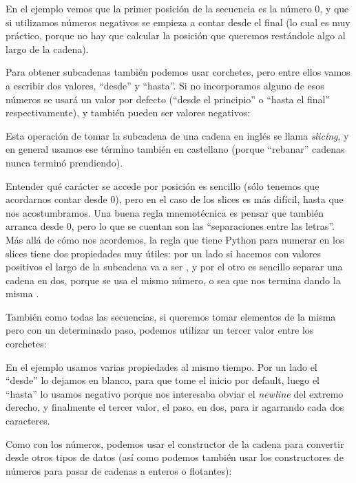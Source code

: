 En el ejemplo vemos que la primer posición de la secuencia es la número 0, y que si utilizamos números negativos se empieza a contar desde el final (lo cual es muy práctico, porque no hay que calcular la posición que queremos restándole algo al largo de la cadena).

Para obtener subcadenas también podemos usar corchetes, pero entre ellos vamos a escribir dos valores, ``desde'' y ``hasta''. Si no incorporamos alguno de esos números se usará un valor por defecto (``desde el principio'' o ``hasta el final'' respectivamente), y también pueden ser valores negativos:


Esta operación de tomar la subcadena de una cadena en inglés se llama \textit{slicing}, y en general usamos ese término también en castellano (porque ``rebanar'' cadenas nunca terminó prendiendo). 

Entender qué carácter se accede por posición es sencillo (sólo tenemos que acordarnos contar desde 0), pero en el caso de los slices es más difícil, hasta que nos acostumbramos. Una buena regla mnemotécnica es pensar que también arranca desde 0, pero lo que se cuentan son las ``separaciones entre las letras''. Más allá de cómo nos acordemos, la regla que tiene Python para numerar en los slices tiene dos propiedades muy útiles: por un lado si hacemos  con valores positivos el largo de la subcadena va a ser , y por el otro es sencillo separar una cadena en dos, porque se usa el mismo número, o sea que  nos termina dando la misma .

También como todas las secuencias, si queremos tomar elementos de la misma pero con un determinado paso, podemos utilizar un tercer valor entre los corchetes:


En el ejemplo usamos varias propiedades al mismo tiempo. Por un lado el ``desde'' lo dejamos en blanco, para que tome el inicio por default, luego el ``hasta'' lo usamos negativo porque nos interesaba obviar el \textit{newline} del extremo derecho, y finalmente el tercer valor, el paso, en dos, para ir agarrando cada dos caracteres.

Como con los números, podemos usar el constructor  de la cadena para convertir desde otros tipos de datos (así como podemos también usar los constructores de números para pasar de cadenas a enteros o flotantes):


